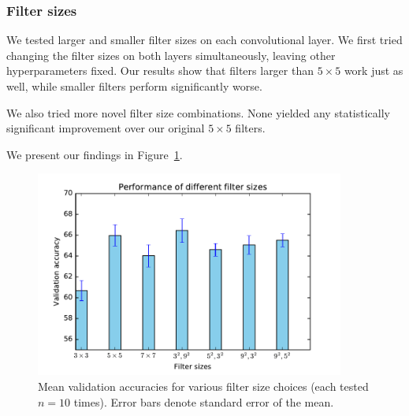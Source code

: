 \documentclass{article}
\begin{document}
\begin{multicols}{2}
\subsubsection{Filter sizes}

We tested larger and smaller filter sizes
on each convolutional layer.
We first tried changing the filter sizes on both layers simultaneously,
leaving other hyperparameters fixed.
Our results show that filters larger than $5\times 5$
work just as well,
while smaller filters perform significantly worse.

We also tried more novel filter size combinations.
None yielded any statistically significant improvement
over our original $5\times 5$ filters.

We present our findings
in Figure~\ref{fig:filter-size-experiment}.

\begin{figure}[t]
   \centering
   \includegraphics[width=4in]{img/2-5-filter-size-acc.pdf} 
   \caption{Mean validation accuracies for various filter size choices (each tested $n=10$ times).
       Error bars denote standard error of the mean.}
   \label{fig:filter-size-experiment}
\end{figure}




\end{multicols}
\end{document}
